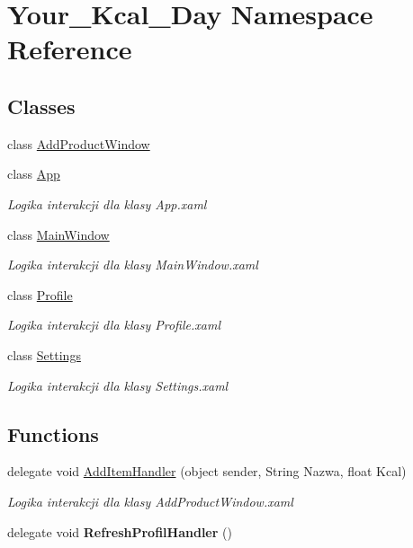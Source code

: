\hypertarget{namespace_your___kcal___day}{}\section{Your\+\_\+\+Kcal\+\_\+\+Day Namespace Reference}
\label{namespace_your___kcal___day}
\subsection*{Classes}
\begin{DoxyCompactItemize}
\item 
class \mbox{\hyperlink{class_your___kcal___day_1_1_add_product_window}{Add\+Product\+Window}}
\item 
class \mbox{\hyperlink{class_your___kcal___day_1_1_app}{App}}
\begin{DoxyCompactList}\small\item\em Logika interakcji dla klasy App.\+xaml \end{DoxyCompactList}\item 
class \mbox{\hyperlink{class_your___kcal___day_1_1_main_window}{Main\+Window}}
\begin{DoxyCompactList}\small\item\em Logika interakcji dla klasy Main\+Window.\+xaml \end{DoxyCompactList}\item 
class \mbox{\hyperlink{class_your___kcal___day_1_1_profile}{Profile}}
\begin{DoxyCompactList}\small\item\em Logika interakcji dla klasy Profile.\+xaml \end{DoxyCompactList}\item 
class \mbox{\hyperlink{class_your___kcal___day_1_1_settings}{Settings}}
\begin{DoxyCompactList}\small\item\em Logika interakcji dla klasy Settings.\+xaml \end{DoxyCompactList}\end{DoxyCompactItemize}
\subsection*{Functions}
\begin{DoxyCompactItemize}
\item 
delegate void \mbox{\hyperlink{namespace_your___kcal___day_a544d00dcbc6dc192f292015082379618}{Add\+Item\+Handler}} (object sender, String Nazwa, float Kcal)
\begin{DoxyCompactList}\small\item\em Logika interakcji dla klasy Add\+Product\+Window.\+xaml \end{DoxyCompactList}\item 
\mbox{\label{namespace_your___kcal___day_afe9509b8871652cbeaebfc56d6a47a82}} 
delegate void {\bfseries Refresh\+Profil\+Handler} ()
\end{DoxyCompactItemize}


